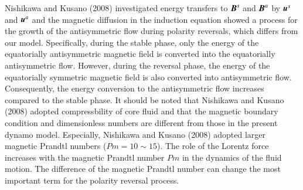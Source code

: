 

Nishikawa and Kusano (2008) %
investigated energy transfers to $\mbox{\boldmath$B$}^s$ and $\mbox{\boldmath$B$}^a$ by $\mbox{\boldmath$u$}^s$ and $\mbox{\boldmath$u$}^a$ and the magnetic diffusion in the induction equation
{\color{teal}
showed a process for the growth of the antisymmetric flow during polarity reversals, which differs from our model.
Specifically, during the stable phase, only the energy of the equatorially antisymmetric magnetic field is converted into the equatorially antisymmetric flow. However, during the reversal phase, the energy of the equatorially symmetric magnetic field is also converted into antisymmetric flow. Consequently, the energy conversion to the antisymmetric flow increases compared to the stable phase.
}
It should be noted that Nishikawa and Kusano (2008) adopted compressbility of core fluid and that the magnetic boundary condition and dimensionless numbers are different from those in the present dynamo model.
Especially, Nishikawa and Kusano (2008) adopted larger magnetic Prandtl numbers ($Pm = 10 \sim 15$). 
The role of the Lorentz force increases with the magnetic Prandtl number $Pm$ in the dynamics of the fluid motion.
The difference of the magnetic Prandtl number can change the most important term for the polarity reversal process. 


